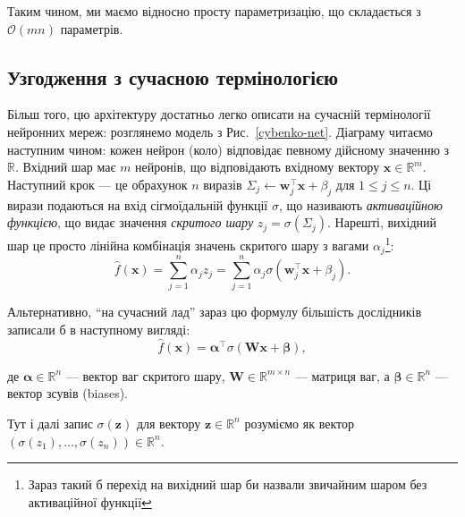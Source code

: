 Таким чином, ми маємо відносно просту параметризацію, що складається з
$\mathcal{O}(mn)$ параметрів. 

\subsection{Узгодження з сучасною термінологією}
Більш того, цю архітектуру достатньо легко описати
на сучасній термінології нейронних мереж: розглянемо модель з
Рис.~\ref{cybenko-net}. Діаграму читаємо наступним чином: кожен нейрон (коло)
відповідає певному дійсному значенню з $\mathbb{R}$. Вхідний шар має $m$
нейронів, що відповідають вхідному вектору $\mathbf{x} \in \mathbb{R}^m$.
Наступний крок --- це обрахунок $n$ виразів $\Sigma_j \gets
\boldsymbol{w}_j^{\top}\mathbf{x}+\beta_j$ для $1 \leq j \leq n$. Ці вирази
подаються на вхід сігмоїдальній функції $\sigma$, що називають
\textit{активаційною функцією}, що видає значення \textit{скритого шару} $z_j =
\sigma(\Sigma_j)$. Нарешті, вихідний шар це просто лінійна комбінація значень
скритого шару з вагами $\alpha_j$\footnote{Зараз такий б перехід на вихідний шар
би назвали звичайним шаром без активаційної функції}:
\begin{equation*}
	\hat{f}(\mathbf{x}) = \sum_{j=1}^n \alpha_j z_j = \sum_{j=1}^n \alpha_j \sigma(\boldsymbol{w}_j^{\top}\mathbf{x} + \beta_j).
\end{equation*}

Альтернативно, ``на сучасний лад'' зараз цю формулу більшість дослідників записали б в наступному вигляді:
\begin{equation*}\label{eq:modern_cybenko}
	\hat{f}(\mathbf{x}) = \boldsymbol{\alpha}^{\top}\sigma(\boldsymbol{W}\mathbf{x} + \boldsymbol{\beta}),
\end{equation*}

де $\boldsymbol{\alpha} \in \mathbb{R}^n$ --- вектор ваг скритого шару,
$\boldsymbol{W} \in \mathbb{R}^{m \times n}$ --- матриця ваг, а
$\boldsymbol{\beta} \in \mathbb{R}^n$ --- вектор зсувів (biases). 
\begin{remark}
    Тут і далі запис $\sigma(\mathbf{z})$ для вектору $\mathbf{z} \in
    \mathbb{R}^n$ розуміємо як вектор $(\sigma(z_1),\dots,\sigma(z_n)) \in \mathbb{R}^n$.
\end{remark}

